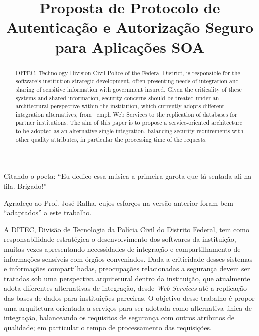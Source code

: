 \documentclass[mpca]{unb-cic}
\title{Proposta de Protocolo de Autenticação e Autorização Seguro para Aplicações SOA}%
\begin{document}
  \maketitle

  \begin{dedicatoria}
Citando o poeta: ``Eu dedico essa música a primeira garota que tá sentada ali na fila. Brigado!''
  \end{dedicatoria}

  \begin{agradecimentos}
Agradeço ao Prof. José Ralha, cujos esforços na versão anterior foram bem ``adaptados'' a este trabalho.
  \end{agradecimentos}


\begin{resumo}
  A DITEC, Divisão de Tecnologia da Polícia Civil do Distrito Federal, tem como responsabilidade estratégica o desenvolvimento dos softwares da instituição, muitas vezes apresentando necessidades de integração e compartilhamento de informações sensíveis com órgãos conveniados. Dada a criticidade desses sistemas e informações compartilhadas, preocupações relacionadas a segurança devem ser tratadas sob uma perspectiva arquitetural dentro da instituição, que atualmente adota diferentes alternativas de integração, desde \emph{Web Services} até a replicação das bases de dados para instituições parceiras. O objetivo desse trabalho é propor uma arquitetura orientada a serviços para ser adotada como alternativa única de integração, balanceando os requisitos de segurança com outros atributos de qualidade; em particular o tempo de processamento das requisições.
\end{resumo}

\begin{abstract}
 DITEC, Technology Division Civil Police of the Federal District, is responsible for the software's institution strategic development, often presenting needs of integration and sharing of sensitive information with government insured. Given the criticality of these systems and shared information, security concerns should be treated under an architectural perspective within the institution, which currently adopts different integration alternatives, from \ emph {Web Services} to the replication of databases for partner institutions. The aim of this paper is to propose a service-oriented architecture to be adopted as an alternative single integration, balancing security requirements with other quality attributes, in particular the processing time of the requests.

\end{abstract}
  \tableofcontents
  \listoffigures
  \listoftables
\end{document}
